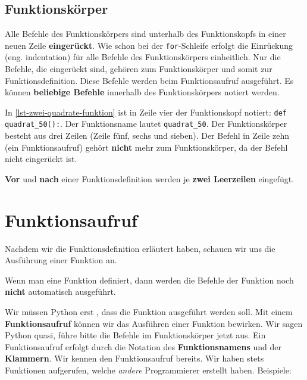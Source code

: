 \subsection{Funktionskörper}

Alle Befehle des Funktionskörpers sind unterhalb des Funktionskopfs in einer neuen Zeile \textbf{eingerückt}. Wie schon bei der \lstinline{for}-Schleife erfolgt die Einrückung (eng. indentation) für alle Befehle des Funktionskörpers einheitlich. Nur die Befehle, die eingerückt sind, gehören zum Funktionskörper und somit zur Funktionsdefinition. Diese Befehle werden beim Funktionsaufruf ausgeführt. Es können \textbf{beliebige Befehle} innerhalb des Funktionskörpers notiert werden.

\begin{example}

In \autoref{lst-zwei-quadrate-funktion} ist in Zeile vier der Funktionskopf notiert: \texttt{def quadrat\_50():}. Der Funktionsname lautet \texttt{quadrat\_50}. Der Funktionskörper besteht aus drei Zeilen (Zeile fünf, sechs und sieben). Der Befehl in Zeile zehn (ein Funktionsaufruf) gehört \textbf{nicht} mehr zum Funktionskörper, da der Befehl nicht eingerückt ist.

\end{example}

\begin{cleancode}
\textbf{Vor} und \textbf{nach} einer Funktionsdefinition werden je \textbf{zwei Leerzeilen} eingefügt.
\end{cleancode}

\section{Funktionsaufruf}

Nachdem wir die Funktionsdefinition erläutert haben, schauen wir uns die Ausführung einer Funktion an.

\begin{important}
Wenn man eine Funktion definiert, dann werden die Befehle der Funktion noch \textbf{nicht} automatisch ausgeführt.
\end{important}

Wir müssen Python erst , dass die Funktion ausgeführt werden soll. Mit einem \textbf{Funktionsaufruf} können wir das Ausführen einer Funktion bewirken. Wir sagen Python quasi, führe bitte die Befehle im Funktionskörper jetzt aus. Ein Funktionsaufruf erfolgt durch die Notation des \textbf{Funktionsnamens} und der \textbf{Klammern}. Wir kennen den Funktionsaufruf bereits. Wir haben stets Funktionen aufgerufen, welche \textit{andere} Programmierer erstellt haben. Beispiele:

